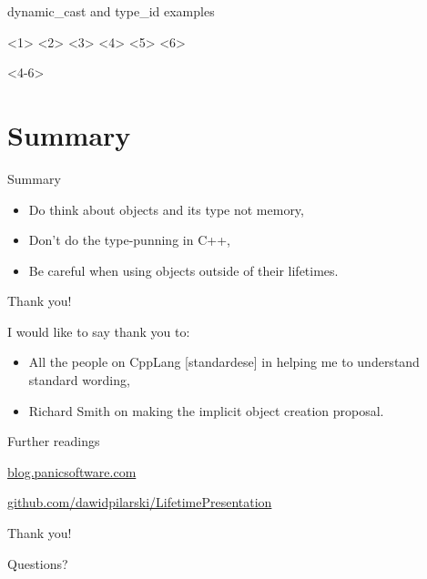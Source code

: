 \documentclass{panicsoftware-presentation}
\makeatletter
\newenvironment{itemizeSeq}{\begin{itemize}[<+-|alert@+>]}{\end{itemize}}
\makeatother
\begin{document}
\begin{frame}{dynamic\_cast and type\_id examples}

<1>
<2>
<3>
<4>
<5>
<6>

<4-6>

\end{frame}

\section*{Summary}

\begin{frame}{Summary}

\begin{itemizeSeq}
\item Do think about objects and its type not memory,
\item Don't do the type-punning in C++,
\item Be careful when using objects outside of their lifetimes. 
\end{itemizeSeq}

\end{frame}

\begin{frame}{Thank you!}

I would like to say thank you to:

\begin{itemize}
\item All the people on CppLang [standardese] in helping me to understand standard wording,
\item Richard Smith on making the implicit object creation proposal.
\end{itemize}

\end{frame}


\begin{frame}{Further readings}

\vfill

\centerline{\alert{\href{http://blog.panicsoftware.com}{blog.panicsoftware.com}}}

\vfill

\centerline{\alert{\href{https://github.com/dawidpilarski/LifetimePresentation}{github.com/dawidpilarski/LifetimePresentation}}}

\vfill
\end{frame}

\begin{frame}{Thank you!}

\centerline{Questions?}

\end{frame}
\end{document}

